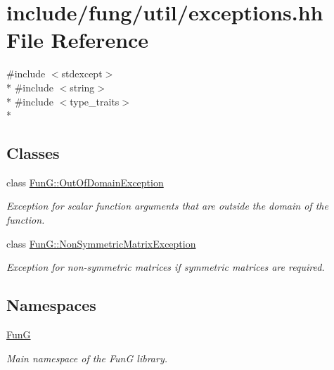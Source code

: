 \hypertarget{exceptions_8hh}{}\section{include/fung/util/exceptions.hh File Reference}
\label{exceptions_8hh}
{\ttfamily \#include $<$stdexcept$>$}\\*
{\ttfamily \#include $<$string$>$}\\*
{\ttfamily \#include $<$type\+\_\+traits$>$}\\*
\subsection*{Classes}
\begin{DoxyCompactItemize}
\item 
class \hyperlink{classFunG_1_1OutOfDomainException}{Fun\+G\+::\+Out\+Of\+Domain\+Exception}
\begin{DoxyCompactList}\small\item\em Exception for scalar function arguments that are outside the domain of the function. \end{DoxyCompactList}\item 
class \hyperlink{classFunG_1_1NonSymmetricMatrixException}{Fun\+G\+::\+Non\+Symmetric\+Matrix\+Exception}
\begin{DoxyCompactList}\small\item\em Exception for non-\/symmetric matrices if symmetric matrices are required. \end{DoxyCompactList}\end{DoxyCompactItemize}
\subsection*{Namespaces}
\begin{DoxyCompactItemize}
\item 
 \hyperlink{namespaceFunG}{FunG}
\begin{DoxyCompactList}\small\item\em Main namespace of the FunG library. \end{DoxyCompactList}\end{DoxyCompactItemize}
